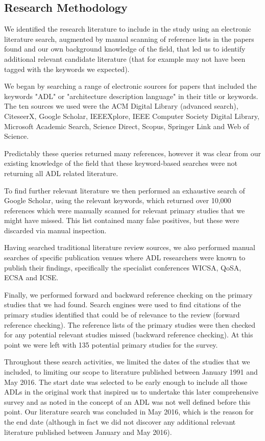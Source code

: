 \subsection{Research Methodology}

We identified the research literature to include in the study using an electronic literature search, augmented by manual scanning of reference lists in the papers found and our own background knowledge of the field, that led us to identify additional relevant candidate literature (that for example may not have been tagged with the keywords we expected).

We began by searching a range of electronic sources for papers that included the keywords "ADL" or "architecture description language" in their title or keywords.  The ten sources we used were the ACM Digital Library (advanced search), CiteseerX, Google Scholar, IEEEXplore, IEEE Computer Society Digital Library, Microsoft Academic Search, Science Direct, Scopus, Springer Link and Web of Science.

Predictably these queries returned many references, however it was clear from our existing knowledge of the field that these keyword-based searches were not returning all ADL related literature. 

To find further relevant literature we then performed an exhaustive search of Google Scholar, using the relevant keywords, which returned over 10,000 references which were manually scanned for relevant primary studies that we might have missed.  This list contained many false positives, but these were discarded via manual inspection. 

Having searched traditional literature review sources, we also performed manual searches of specific publication venues where ADL researchers were known to publish their findings, specifically the specialist conferences WICSA, QoSA, ECSA and ICSE.

Finally, we performed forward and backward reference checking on the primary studies that we had found. Search engines were used to find citations of the primary studies identified that could be of relevance to the review (forward reference checking). The reference lists of the primary studies were then checked for any potential relevant studies missed (backward reference checking). At this point we were left with 135 potential primary studies for the survey.

Throughout these search activities, we limited the dates of the studies that we included, to limiting our scope to literature published between January 1991 and May 2016. The start date was selected to be early enough to include all those ADLs in the original work \cite{medvidovic2000-adlcomparison} that inspired us to undertake this later comprehensive survey and as noted in \cite{malavolta2013-industryadlneeds} the concept of an ADL was not well defined before this point.  Our literature search was concluded in May 2016, which is the reason for the end date (although in fact we did not discover any additional relevant literature published between January and May 2016).

